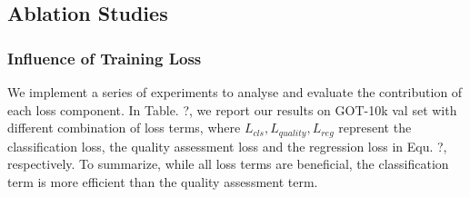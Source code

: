 \documentclass{article}
\begin{document}
\begin{table}[ht]
\centering
{}
\caption{Precision score relative to the real trajectory on OTB2015.}
\label{tab:untargeted}
\end{table}

\begin{table}[ht]
\centering
{}
\caption{Precision score relative to the fake trajectory on OTB2015.}
\label{tab:targeted}
\end{table}

\subsection{Ablation Studies}

\subsubsection{Influence of Training Loss}

We implement a series of experiments to analyse and evaluate the contribution of each loss component.
In Table. ?, we report our results on GOT-10k val set with different combination of loss terms, where $L_{cls}, L_{quality}, L_{reg}$ represent the classification loss, the quality assessment loss and the regression loss in Equ. ?, respectively.
To summarize, while all loss terms are beneficial, the classification term is more efficient than the quality assessment term. 
\end{document}
